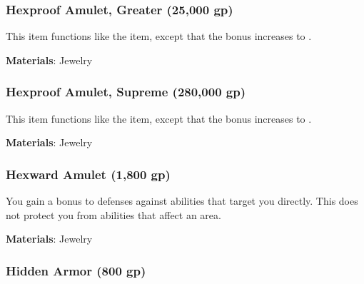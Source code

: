 \lowercase{\hypertarget{item:Hexproof Amulet, Greater}{}}\label{item:Hexproof Amulet, Greater}
\hypertarget{item:Hexproof Amulet, Greater}{\subsubsection{Hexproof Amulet, Greater\hfill{} (25,000 gp)}}

This item functions like the  item, except that the bonus increases to .



\vspace{0.25em}
\textbf{Materials}: Jewelry


\lowercase{\hypertarget{item:Hexproof Amulet, Supreme}{}}\label{item:Hexproof Amulet, Supreme}
\hypertarget{item:Hexproof Amulet, Supreme}{\subsubsection{Hexproof Amulet, Supreme\hfill{} (280,000 gp)}}

This item functions like the  item, except that the bonus increases to .



\vspace{0.25em}
\textbf{Materials}: Jewelry


\lowercase{\hypertarget{item:Hexward Amulet}{}}\label{item:Hexward Amulet}
\hypertarget{item:Hexward Amulet}{\subsubsection{Hexward Amulet\hfill{} (1,800 gp)}}

You gain a  bonus to defenses against  abilities that target you directly.
This does not protect you from abilities that affect an area.



\vspace{0.25em}
\textbf{Materials}: Jewelry


\lowercase{\hypertarget{item:Hidden Armor}{}}\label{item:Hidden Armor}
\hypertarget{item:Hidden Armor}{\subsubsection{Hidden Armor\hfill{} (800 gp)}}

